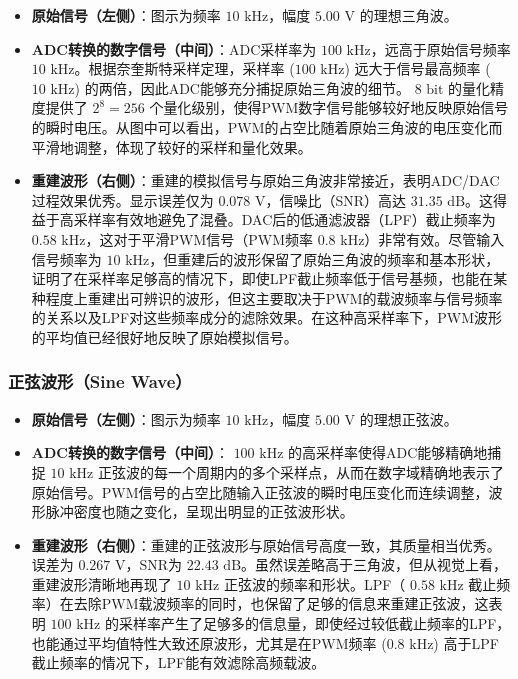 \documentclass[12pt]{article}
\begin{document}
\begin{itemize}
    \item \textbf{原始信号（左侧）}：图示为频率 $10 \text{ kHz}$，幅度 $5.00 \text{ V}$ 的理想三角波。
    \item \textbf{ADC转换的数字信号（中间）}：ADC采样率为 $100 \text{ kHz}$，远高于原始信号频率 $10 \text{ kHz}$。根据奈奎斯特采样定理，采样率 ($100 \text{ kHz}$) 远大于信号最高频率 ($10 \text{ kHz}$) 的两倍，因此ADC能够充分捕捉原始三角波的细节。 $8 \text{ bit}$ 的量化精度提供了 $2^8 = 256$ 个量化级别，使得PWM数字信号能够较好地反映原始信号的瞬时电压。从图中可以看出，PWM的占空比随着原始三角波的电压变化而平滑地调整，体现了较好的采样和量化效果。
    \item \textbf{重建波形（右侧）}：重建的模拟信号与原始三角波非常接近，表明ADC/DAC过程效果优秀。显示误差仅为 $0.078 \text{ V}$，信噪比（SNR）高达 $31.35 \text{ dB}$。这得益于高采样率有效地避免了混叠。DAC后的低通滤波器（LPF）截止频率为 $0.58 \text{ kHz}$，这对于平滑PWM信号（PWM频率 $0.8 \text{ kHz}$）非常有效。尽管输入信号频率为 $10 \text{ kHz}$，但重建后的波形保留了原始三角波的频率和基本形状，证明了在采样率足够高的情况下，即使LPF截止频率低于信号基频，也能在某种程度上重建出可辨识的波形，但这主要取决于PWM的载波频率与信号频率的关系以及LPF对这些频率成分的滤除效果。在这种高采样率下，PWM波形的平均值已经很好地反映了原始模拟信号。
\end{itemize}

\subsubsection{正弦波形（Sine Wave）}

\begin{itemize}
    \item \textbf{原始信号（左侧）}：图示为频率 $10 \text{ kHz}$，幅度 $5.00 \text{ V}$ 的理想正弦波。
    \item \textbf{ADC转换的数字信号（中间）}： $100 \text{ kHz}$ 的高采样率使得ADC能够精确地捕捉 $10 \text{ kHz}$ 正弦波的每一个周期内的多个采样点，从而在数字域精确地表示了原始信号。PWM信号的占空比随输入正弦波的瞬时电压变化而连续调整，波形脉冲密度也随之变化，呈现出明显的正弦波形状。
    \item \textbf{重建波形（右侧）}：重建的正弦波形与原始信号高度一致，其质量相当优秀。误差为 $0.267 \text{ V}$，SNR为 $22.43 \text{ dB}$。虽然误差略高于三角波，但从视觉上看，重建波形清晰地再现了 $10 \text{ kHz}$ 正弦波的频率和形状。LPF（ $0.58 \text{ kHz}$ 截止频率）在去除PWM载波频率的同时，也保留了足够的信息来重建正弦波，这表明 $100 \text{ kHz}$ 的采样率产生了足够多的信息量，即使经过较低截止频率的LPF，也能通过平均值特性大致还原波形，尤其是在PWM频率 ($0.8 \text{ kHz}$) 高于LPF截止频率的情况下，LPF能有效滤除高频载波。
\end{itemize}
\end{document}
